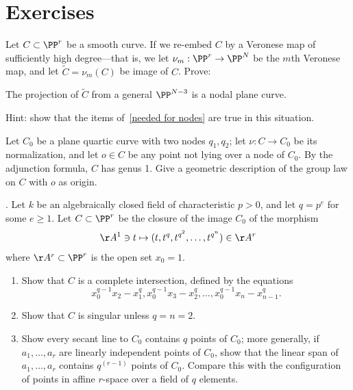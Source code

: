 \section{Exercises}

\begin{exercise}
Let $C\subset \PP^r$ be a smooth curve. If we re-embed $C$ by a Veronese map of sufficiently high degree---that is, we let $\nu_m : \PP^r \to \PP^N$ be the $m$th Veronese map, and let $\widetilde C = \nu_m(C)$ be image of $C$. Prove:

\begin{proposition}\label{positive characteristic nodes}
The projection of $\widetilde C$ from a general $\PP^{N-3}$ is a nodal plane curve.
\end{proposition}

Hint: show that the items of~\ref{needed for nodes}  are true in this situation.
\end{exercise}

\begin{exercise}
Let $C_0$ be a plane quartic curve with two nodes $q_1, q_2$; let $\nu : C \to C_0$ be its normalization, and let $o \in C$ be any point not lying over a node of $C_0$.
By the adjunction formula, $C$ has genus 1. Give a geometric description
of the group law on $C$ with $o$ as origin.
\end{exercise}

\begin{exercise}\label{strange curves} \cite{Rathmann}. Let $k$ be an algebraically closed field of characteristic $p>0$, and let $q=p^e$ for some $e\geq 1$. Let $C\subset \PP^r$
be the closure of the image $C_0$ of the morphism
$$
\AA^1 \ni t \mapsto (t, t^q, t^{q^2}, \dots , t^{q^{n}}) \in \AA^r
$$
where $\AA^r\subset \PP^r$ is the open set $x_0=1$. 
\begin{enumerate}
\item Show that $C$ is a complete intersection, defined by the equations
$$
x_0^{q-1}x_2 - x_1^q, x_0^{q-1}x_3 - x_2^q,\dots, 
x_0^{q-1}x_n - x_{n-1}^q.
$$
\item Show that $C$ is singular unless $q = n = 2$.
\item Show every secant line to $C_0$ contains $q$ points of $C_0$; more generally, if
$a_1, \dots, a_r$ are linearly independent points of $C_0$, show that the linear span of
$a_1, \dots, a_r$ contains $q^{(r-1)}$ points of $C_0$.  Compare this with the configuration of
points in affine $r$-space over a field of $q$ elements.
\end{enumerate}
\end{exercise}

